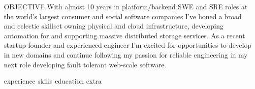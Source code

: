 \documentclass{resume}
\begin{document}

\begin{rSection}{OBJECTIVE}
{With almost 10 years in platform/backend SWE and SRE roles at the world's largest consumer and social software companies I've honed a broad and eclectic skillset owning physical and cloud infrastructure, developing automation for and supporting massive distributed storage services. As a recent startup founder and experienced engineer I'm excited for opportunities to develop in new domains and continue following my passion for reliable engineering in my next role developing fault tolerant web-scale software.}
\end{rSection}


{experience}
{skills}
{education}
{extra}
\end{document}
